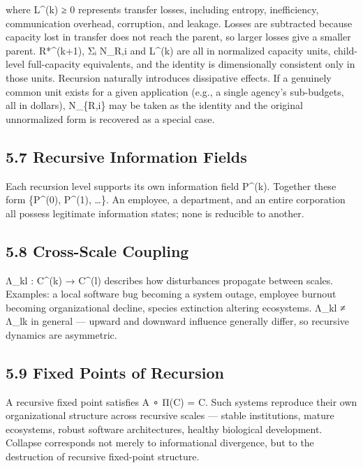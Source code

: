 \documentclass[
]{article}
\begin{document}
where L\^{}(k) ≥ 0 represents transfer losses, including entropy,
inefficiency, communication overhead, corruption, and leakage. Losses
are subtracted because capacity lost in transfer does not reach the
parent, so larger losses give a smaller parent. R*\^{}(k+1), Σᵢ N\_R,i
and L\^{}(k) are all in normalized capacity units, child-level
full-capacity equivalents, and the identity is dimensionally consistent
only in those units. Recursion naturally introduces dissipative effects.
If a genuinely common unit exists for a given application (e.g., a
single agency's sub-budgets, all in dollars), N\_\{R,i\} may be taken as
the identity and the original unnormalized form is recovered as a
special case.

\hypertarget{recursive-information-fields}{%
\subsection{5.7 Recursive Information
Fields}\label{recursive-information-fields}}

Each recursion level supports its own information field P\^{}(k).
Together these form \{P\^{}(0), P\^{}(1), \ldots\}. An employee, a
department, and an entire corporation all possess legitimate information
states; none is reducible to another.

\hypertarget{cross-scale-coupling}{%
\subsection{5.8 Cross-Scale Coupling}\label{cross-scale-coupling}}

Λ\_kl : C\^{}(k) → C\^{}(l) describes how disturbances propagate between
scales. Examples: a local software bug becoming a system outage,
employee burnout becoming organizational decline, species extinction
altering ecosystems. Λ\_kl ≠ Λ\_lk in general --- upward and downward
influence generally differ, so recursive dynamics are asymmetric.

\hypertarget{fixed-points-of-recursion}{%
\subsection{5.9 Fixed Points of
Recursion}\label{fixed-points-of-recursion}}

A recursive fixed point satisfies A ∘ Π(C) = C. Such systems reproduce
their own organizational structure across recursive scales --- stable
institutions, mature ecosystems, robust software architectures, healthy
biological development. Collapse corresponds not merely to informational
divergence, but to the destruction of recursive fixed-point structure.
\end{document}
